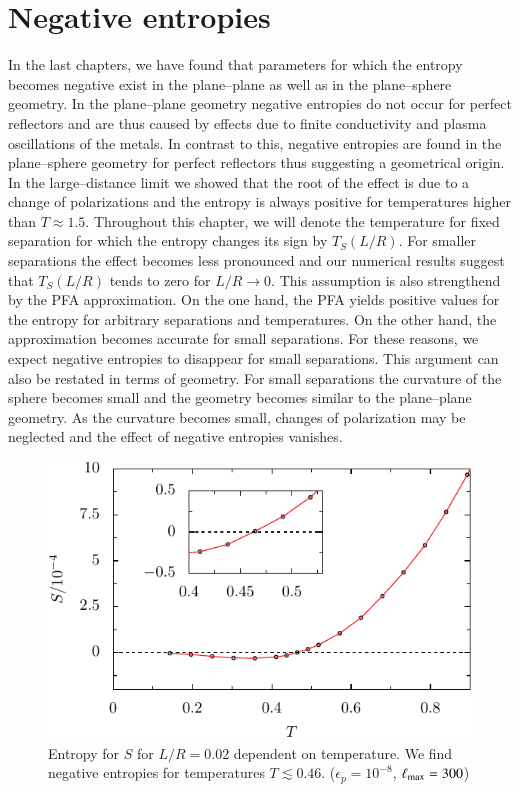 \chapter{Negative entropies}
\label{chapter_negative_entropies}

In the last chapters, we have found that parameters for which the entropy
becomes negative exist in the plane--plane as well as in the plane--sphere
geometry. In the plane--plane geometry negative entropies do not occur for
perfect reflectors and are thus caused by effects due to finite conductivity
and plasma oscillations of the metals. In contrast to this, negative entropies
are found in the plane--sphere geometry for perfect reflectors thus suggesting
a geometrical origin. In the large--distance limit we showed that the root of
the effect is due to a change of polarizations and the entropy is always
positive for temperatures higher than $T\approx1.5$. Throughout this chapter,
we will denote the temperature for fixed separation for which the entropy
changes its sign by $T_S(L/R)$. For smaller separations the effect becomes
less pronounced and our numerical results suggest that $T_S(L/R)$ tends to zero
for $L/R\to0$. This assumption is also strengthend by the PFA approximation. On
the one hand, the PFA yields positive values for the entropy for arbitrary
separations and temperatures. On the other hand, the approximation becomes
accurate for small separations. For these reasons, we expect negative entropies
to disappear for small separations. This argument can also be restated in terms
of geometry. For small separations the curvature of the sphere becomes small
and the geometry becomes similar to the plane--plane geometry. As the
curvature becomes small, changes of polarization may be neglected and the
effect of negative entropies vanishes.

\begin{figure}
    \begin{center}
    \includegraphics[scale=1]{plots/negentropies/S.pdf}
    \end{center}

    \caption{Entropy for $S$ for $L/R=0.02$ dependent on temperature. We find negative entropies for temperatures $T \lesssim 0.46$. ($\epsilon_p=10^{-8}$, ${\ell_\text{max}}=300$)}

    \label{fig:neg_entropies_example}
\end{figure}

